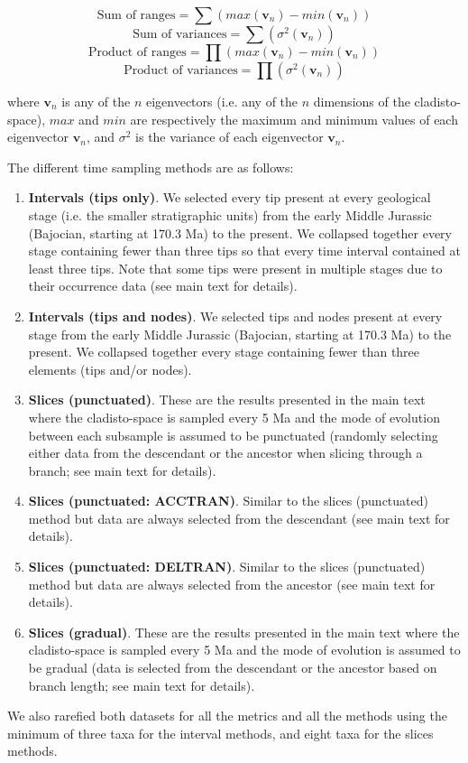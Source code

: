 \documentclass[12pt,letterpaper]{article}
\begin{document}
\begin{equation}
    \text{Sum of ranges}=\sum{(max(\mathbf{v}_{n})-min(\mathbf{v}_{n}))}
\end{equation}
\begin{equation}
    \text{Sum of variances}=\sum{(\sigma^{2}(\mathbf{v}_{n}))}
\end{equation}
\begin{equation}
    \text{Product of ranges}=\prod{(max(\mathbf{v}_{n})-min(\mathbf{v}_{n}))}
\end{equation}
\begin{equation}
    \text{Product of variances}=\prod{(\sigma^{2}(\mathbf{v}_{n}))}
\end{equation}

\noindent
where $\mathbf{v}_{n}$ is any of the $n$ eigenvectors (i.e. any of the $n$ dimensions of the cladisto-space), $max$ and $min$ are respectively the maximum and minimum values of each eigenvector $\mathbf{v}_{n}$, and $\sigma^{2}$ is the variance of each eigenvector $\mathbf{v}_{n}$. 

The different time sampling methods are as follows:
\begin{enumerate}
\item \textbf{Intervals (tips only)}.
We selected every tip present at every geological stage (i.e. the smaller stratigraphic units) from the early Middle Jurassic (Bajocian, starting at 170.3 Ma) to the present.
We collapsed together every stage containing fewer than three tips so that every time interval contained at least three tips.
Note that some tips were present in multiple stages due to their occurrence data (see main text for details).
\item \textbf{Intervals (tips and nodes)}.
We selected tips and nodes present at every stage from the early Middle Jurassic (Bajocian, starting at 170.3 Ma) to the present.
We collapsed together every stage containing fewer than three elements (tips and/or nodes).
\item \textbf{Slices (punctuated)}.
These are the results presented in the main text where the cladisto-space is sampled every 5 Ma and the mode of evolution between each subsample is assumed to be punctuated (randomly selecting either data from the descendant or the ancestor when slicing through a branch; see main text for details).
\item \textbf{Slices (punctuated: ACCTRAN)}.
Similar to the slices (punctuated) method but data are always selected from the descendant (see main text for details).
\item \textbf{Slices (punctuated: DELTRAN)}.
Similar to the slices (punctuated) method but data are always selected from the ancestor (see main text for details).
\item \textbf{Slices (gradual)}.
These are the results presented in the main text where the cladisto-space is sampled every 5 Ma and the mode of evolution is assumed to be gradual (data is selected from the descendant or the ancestor based on branch length; see main text for details).
\end{enumerate}
We also rarefied both datasets for all the metrics and all the methods using the minimum of three taxa for the interval methods, and eight taxa for the slices methods.
\end{document}
